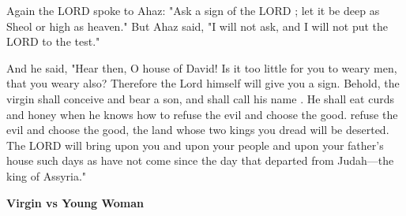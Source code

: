 \documentclass[11pt]{article}
\begin{document}
\newpage

\begin{biblicaloutline}[Isaiah 7:10-17]

    
    \begin{versesection}{2em}
         Again the LORD spoke to Ahaz:  "Ask a sign of the LORD ; let it be deep as Sheol or high as heaven."  But Ahaz said, "I will not ask, and I will not put the LORD to the test."
    \end{versesection}
    
    
    \begin{versesection}{2em}
         And he said, "Hear then, O house of David! Is it too little for you to weary men, that you weary  also?  Therefore the Lord himself will give you a sign. Behold, the virgin shall conceive and bear a son, and shall call his name .  He shall eat curds and honey when he knows how to refuse the evil and choose the good.   refuse the evil and choose the good, the land whose two kings you dread will be deserted.  The LORD will bring upon you and upon your people and upon your father's house such days as have not come since the day that  departed from Judah—the king of Assyria."
    \end{versesection}

\end{biblicaloutline}

\vspace{3em}
{\large\bfseries Virgin vs Young Woman}
\vspace{1em}

\end{document}
